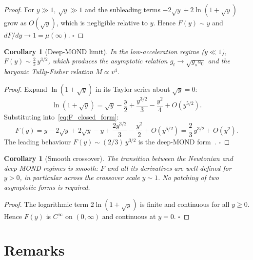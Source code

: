 \documentclass[twocolumn]{iopjournal}
\newtheorem{corollary}[lemma]{Corollary}
\theoremstyle{definition}
\begin{document}
\begin{proof}
For $y \gg 1$, $\sqrt{y} \gg 1$ and the subleading terms
$-2\sqrt{y} + 2\ln(1 + \sqrt{y})$ grow as $O(\sqrt{y})$, which
is negligible relative to $y$.  Hence $F(y) \sim y$ and
$dF/dy \to 1 = \mu(\infty)$.
\hfill$\square$
\end{proof}

\begin{corollary}[Deep-MOND limit]
\label{cor:deep_mond}
In the low-acceleration regime ($y \ll 1$), $F(y) \sim
\tfrac{2}{3}\, y^{3/2}$, which produces the asymptotic relation
$g_t \to \sqrt{g_s a_0}$ and the baryonic Tully-Fisher relation
$M \propto v^4$.
\end{corollary}

\begin{proof}
Expand $\ln(1 + \sqrt{y})$ in its Taylor series about
$\sqrt{y} = 0$:
\begin{equation}
  \ln(1 + \sqrt{y}) = \sqrt{y} - \frac{y}{2}
                    + \frac{y^{3/2}}{3} - \frac{y^2}{4}
                    + O(y^{5/2}).
  \label{eq:taylor}
\end{equation}
Substituting into~\eqref{eq:F_closed_form}:
\begin{equation}
  F(y) = y - 2\sqrt{y} + 2\sqrt{y} - y
       + \frac{2 y^{3/2}}{3} - \frac{y^2}{2} + O(y^{5/2})
       = \frac{2}{3}\, y^{3/2} + O(y^2).
  \label{eq:deep_mond}
\end{equation}
The leading behaviour $F(y) \sim (2/3)\, y^{3/2}$ is the
deep-MOND form~\cite{BekensteinMilgrom1984}.
\hfill$\square$
\end{proof}

\begin{corollary}[Smooth crossover]
\label{cor:crossover}
The transition between the Newtonian and deep-MOND regimes is
smooth: $F$ and all its derivatives are well-defined for
$y > 0$, in particular across the crossover scale $y \sim 1$.
No patching of two asymptotic forms is required.
\end{corollary}

\begin{proof}
The logarithmic term $2\ln(1 + \sqrt{y})$ is finite and
continuous for all $y \geq 0$.  Hence $F(y)$ is $C^\infty$ on
$(0, \infty)$ and continuous at $y = 0$.
\hfill$\square$
\end{proof}


\section*{Remarks}
\end{document}
